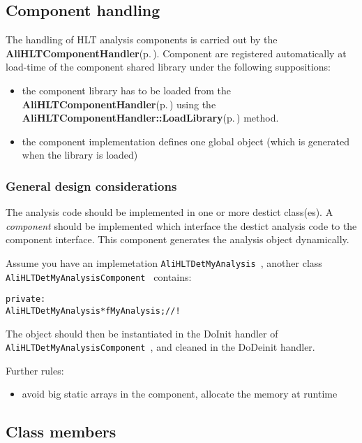 \subsection{Component handling}\label{classAliHLTComponent_alihltcomponent-handling}
The handling of HLT analysis components is carried out by the {\bf Ali\-HLTComponent\-Handler}{\rm (p.\,\pageref{classAliHLTComponentHandler})}. Component are registered automatically at load-time of the component shared library under the following suppositions:\begin{itemize}
\item the component library has to be loaded from the {\bf Ali\-HLTComponent\-Handler}{\rm (p.\,\pageref{classAliHLTComponentHandler})} using the {\bf Ali\-HLTComponent\-Handler::Load\-Library}{\rm (p.\,\pageref{classAliHLTComponentHandler_a6})} method.\item the component implementation defines one global object (which is generated when the library is loaded)\end{itemize}
\subsubsection{General design considerations}\label{classAliHLTComponent_alihltcomponent-design-rules}
The analysis code should be implemented in one or more destict class(es). A {\em component\/} should be implemented which interface the destict analysis code to the component interface. This component generates the analysis object dynamically. \par


Assume you have an implemetation {\tt  Ali\-HLTDet\-My\-Analysis }, another class {\tt  Ali\-HLTDet\-My\-Analysis\-Component } contains: \small\begin{alltt}
 private:
   AliHLTDetMyAnalysis* fMyAnalysis;  //!
 \end{alltt}\normalsize 
 The object should then be instantiated in the Do\-Init handler of {\tt Ali\-HLTDet\-My\-Analysis\-Component }, and cleaned in the Do\-Deinit handler.

Further rules:\begin{itemize}
\item avoid big static arrays in the component, allocate the memory at runtime\end{itemize}
\subsection{Class members}\label{classAliHLTComponent_alihltcomponent-members}




